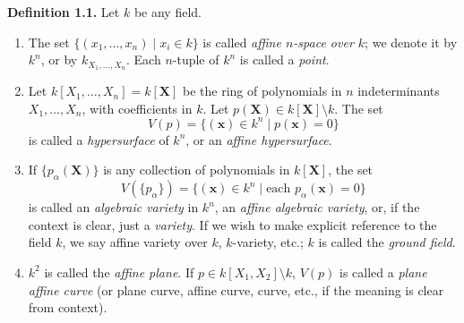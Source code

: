 \textbf{Definition 1.1.} Let $k$ be any field.

\begin{enumerate}
\item[(1.1.1)] The set $\{(x_1, \ldots, x_n) \mid x_i \in k\}$ is called \textit{affine $n$-space over $k$}; we denote it by $k^n$, or by $k_{X_1, \ldots, X_n}$. Each $n$-tuple of $k^n$ is called a \textit{point}.

\item[(1.1.2)] Let $k[X_1, \ldots, X_n] = k[\mathbf{X}]$ be the ring of polynomials in $n$ indeterminants $X_1, \ldots, X_n$, with coefficients in $k$. Let $p(\mathbf{X}) \in k[\mathbf{X}] \setminus k$. The set
$$V(p) = \{(\mathbf{x}) \in k^n \mid p(\mathbf{x}) = 0\}$$
is called a \textit{hypersurface} of $k^n$, or an \textit{affine hypersurface}.

\item[(1.1.3)] If $\{p_\alpha(\mathbf{X})\}$ is any collection of polynomials in $k[\mathbf{X}]$, the set
$$V(\{p_\alpha\}) = \{(\mathbf{x}) \in k^n \mid \text{each } p_\alpha(\mathbf{x}) = 0\}$$
is called an \textit{algebraic variety} in $k^n$, an \textit{affine algebraic variety}, or, if the context is clear, just a \textit{variety}. If we wish to make explicit reference to the field $k$, we say affine variety over $k$, $k$-variety, etc.; $k$ is called the \textit{ground field}.

\item[(1.1.4)] $k^2$ is called the \textit{affine plane}. If $p \in k[X_1, X_2] \setminus k$, $V(p)$ is called a \textit{plane affine curve} (or plane curve, affine curve, curve, etc., if the meaning is clear from context).
\end{enumerate}
